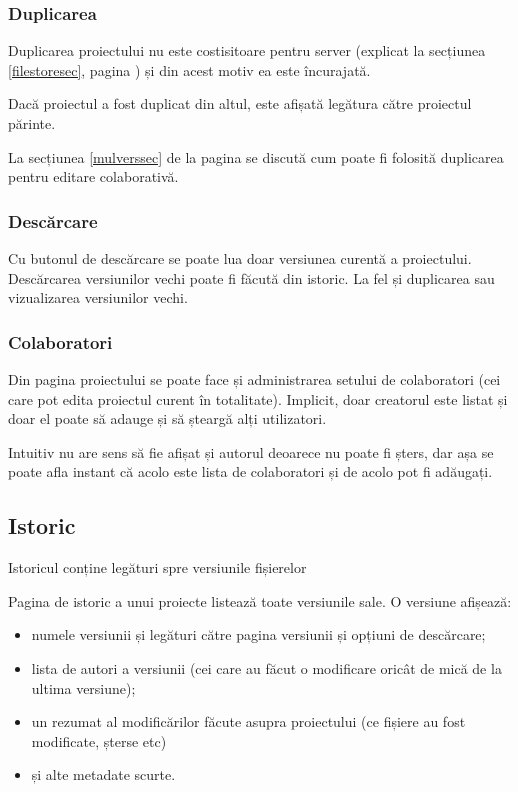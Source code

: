 \documentclass[a4wide,12pt]{report}
\begin{document}
\subsubsection{Duplicarea}

Duplicarea proiectului nu este costisitoare pentru server (explicat la secțiunea
\ref{filestoresec}, pagina \pageref{filestoresec}) și din acest motiv ea este
încurajată.

Dacă proiectul a fost duplicat din altul, este afișată legătura către proiectul
părinte.

La secțiunea \ref{mulverssec} de la pagina \pageref{mulverssec} se discută cum
poate fi folosită duplicarea pentru editare colaborativă.

\subsubsection{Descărcare}

Cu butonul de descărcare se poate lua doar versiunea curentă a proiectului.
Descărcarea versiunilor vechi poate fi făcută din istoric. La fel și duplicarea
sau vizualizarea versiunilor vechi.

\subsubsection{Colaboratori}

Din pagina proiectului se poate face și administrarea setului de colaboratori
(cei care pot edita proiectul curent în totalitate). Implicit, doar creatorul
este listat și doar el poate să adauge și să șteargă alți utilizatori.

Intuitiv nu are sens să fie afișat și autorul deoarece nu poate fi șters, dar
așa se poate afla instant că acolo este lista de colaboratori și de acolo pot fi
adăugați.

\subsection{Istoric}

Istoricul conține legături spre versiunile fișierelor

Pagina de istoric a unui proiecte listează toate versiunile sale. O versiune
afișează:

\begin{itemize}

\item numele versiunii și legături către pagina versiunii și opțiuni de
descărcare;

\item lista de autori a versiunii (cei care au făcut o modificare oricât de mică
de la ultima versiune);

\item un rezumat al modificărilor făcute asupra proiectului (ce fișiere au fost
modificate, șterse etc)

\item și alte metadate scurte.

\end{itemize}
\end{document}
